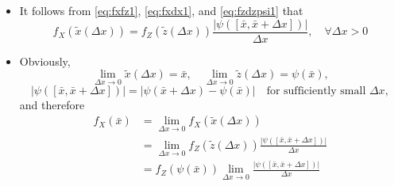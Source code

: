 \documentclass[12pt,a4paper]{article}
\begin{document}
\begin{itemize}
\begin{itemize}
\begin{itemize}
\begin{figure}[t]
        {figures/fig_integration_1.png}
        \caption{%
          Choice of $\tilde{x}(\Delta x)\in [\bar{x},\bar{x}+\Delta x]$ and $\tilde{z}(\Delta x)\in \psi([\bar{x},\bar{x}+\Delta x])$
          that satisfies \eqref{eq:fxdx1} and \eqref{eq:fzdzpsi1}
        } 
        \label{fig:integration_1}
      \end{figure} 
    \item there exists $\tilde{z}(\Delta x) \in \psi([\bar{x},\bar{x}+\Delta x])$ such that
      \begin{equation}\label{eq:fzdzpsi1}%
        \int_{\psi([\bar{x}, \bar{x}+\Delta x])} f_{Z}(z)dz
        =
        \int_{\psi([\bar{x}, \bar{x}+\Delta x])} f_{Z}(\tilde{z}(\Delta x))dz
        =
        f_{Z}(\tilde{z}(\Delta x))|\psi([\bar{x},\bar{x}+\Delta x])|
      \end{equation}
      where $|\psi([\bar{x},\bar{x}+\Delta x])|$ is the measure of the set $\psi([\bar{x},\bar{x}+\Delta x])$
    \end{itemize}
  \item It follows from \eqref{eq:fxfz1}, \eqref{eq:fxdx1}, and \eqref{eq:fzdzpsi1} that
    \begin{equation}\nonumber%
      f_{X}(\tilde{x}(\Delta x))
      = f_{Z}(\tilde{z}(\Delta x)) \frac{|\psi([\bar{x},\bar{x}+\Delta x])|}{\Delta x},
      \quad \forall \Delta x >0
    \end{equation}
  \item Obviously,
    \begin{equation}\nonumber%
      \lim_{\Delta x \to 0}\tilde{x}(\Delta x) = \bar{x},
      \quad
      \lim_{\Delta x \to 0}\tilde{z}(\Delta x) = \psi(\bar{x}),
    \end{equation}
    \begin{equation}\nonumber%
      |\psi([\bar{x},\bar{x}+\Delta x])| =  \left|\psi(\bar{x}+\Delta x) - \psi(\bar{x}) \right|
      \quad \text{for sufficiently small $\Delta x$},
    \end{equation}
    and therefore
    \begin{align}
      f_{X}(\bar{x})
        & = \lim_{\Delta x \to 0}f_{X}(\tilde{x}(\Delta x))  \nonumber \\
        & = \lim_{\Delta x \to 0} f_{Z}(\tilde{z}(\Delta x))\frac{|\psi([\bar{x},\bar{x}+\Delta x])|}{\Delta x}  \nonumber \\
        & = f_{Z}(\psi(\bar{x}))\lim_{\Delta x \to 0} \frac{|\psi([\bar{x},\bar{x}+\Delta x])|}{\Delta x}  \nonumber \\

\end{align}
\end{itemize}
\end{itemize}
\end{document}
